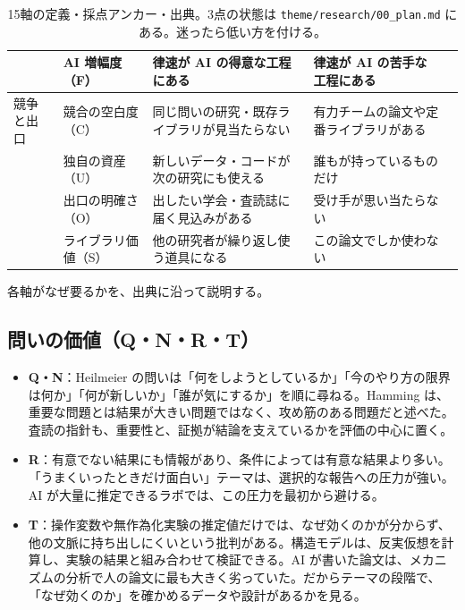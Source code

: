 \documentclass[a4paper,10pt]{ltjsarticle}
\begin{document}
\begin{table}[htbp]
\begin{tabularx}{\linewidth}{llXXp{3.4cm}}
 & AI 増幅度（F） & 律速が AI の得意な工程にある & 律速が AI の苦手な工程にある & \cite{korinek2023,li2026,indxlab} \\
\midrule
競争と出口 & 競合の空白度（C） & 同じ問いの研究・既存ライブラリが見当たらない & 有力チームの論文や定番ライブラリがある & \cite{indxlab} \\
 & 独自の資産（U） & 新しいデータ・コードが次の研究にも使える & 誰もが持っているものだけ & \cite{hamermesh2013} \\
 & 出口の明確さ（O） & 出したい学会・査読誌に届く見込みがある & 受け手が思い当たらない & \cite{card2013} \\
 & ライブラリ価値（S） & 他の研究者が繰り返し使う道具になる & この論文でしか使わない & \cite{josscriteria} \\
\bottomrule
\end{tabularx}
\caption{15軸の定義・採点アンカー・出典。3点の状態は \texttt{theme/research/00\_plan.md} にある。迷ったら低い方を付ける。}
\label{tab:th-axes}
\end{table}

各軸がなぜ要るかを、出典に沿って説明する。

\subsection{問いの価値（Q・N・R・T）}

\begin{itemize}[leftmargin=*]
  \item \textbf{Q・N}：Heilmeier の問いは「何をしようとしているか」「今のやり方の限界は何か」「何が新しいか」「誰が気にするか」を順に尋ねる\parencite{heilmeier}。Hamming は、重要な問題とは結果が大きい問題ではなく、攻め筋のある問題だと述べた\parencite{hamming1986}。査読の指針も、重要性と、証拠が結論を支えているかを評価の中心に置く\parencite{berk2017}。
  \item \textbf{R}：有意でない結果にも情報があり、条件によっては有意な結果より多い\parencite{abadie2020}。「うまくいったときだけ面白い」テーマは、選択的な報告への圧力が強い\parencite{brodeur2020}。AI が大量に推定できるラボでは、この圧力を最初から避ける。
  \item \textbf{T}：操作変数や無作為化実験の推定値だけでは、なぜ効くのかが分からず、他の文脈に持ち出しにくいという批判がある\parencite{deaton2010}。構造モデルは、反実仮想を計算し、実験の結果と組み合わせて検証できる\parencite{low2017}。AI が書いた論文は、メカニズムの分析で人の論文に最も大きく劣っていた\parencite{li2026}。だからテーマの段階で、「なぜ効くのか」を確かめるデータや設計があるかを見る。
\end{itemize}
\end{document}
